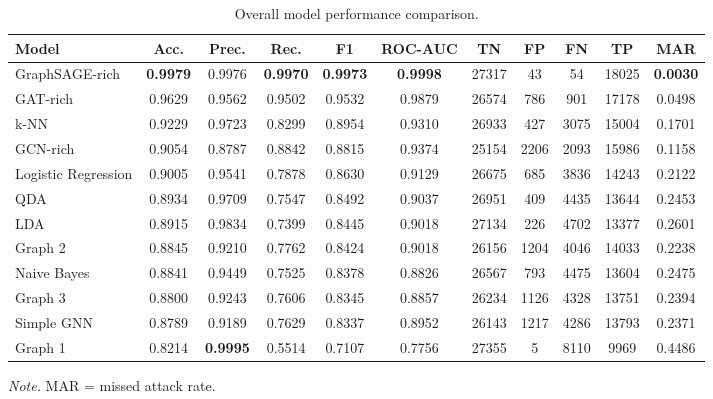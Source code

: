 \documentclass[final,5p,times,twocolumn]{elsarticle}
\begin{document}
\begin{table}[H]
\caption{Overall model performance comparison.}
\centering
\footnotesize
\setlength{\tabcolsep}{4.5pt}
\renewcommand{\arraystretch}{1.12}
\begin{tabular}{lcccccccccc}
\toprule
\textbf{Model} & \textbf{Acc.} & \textbf{Prec.} & \textbf{Rec.} & \textbf{F1} & \textbf{ROC-AUC} & \textbf{TN} & \textbf{FP} & \textbf{FN} & \textbf{TP} & \textbf{MAR} \\
\midrule
GraphSAGE-rich & \textbf{0.9979} & 0.9976 & \textbf{0.9970} & \textbf{0.9973} & \textbf{0.9998} & 27317 & 43 & 54 & 18025 & \textbf{0.0030} \\
GAT-rich & 0.9629 & 0.9562 & 0.9502 & 0.9532 & 0.9879 & 26574 & 786 & 901 & 17178 & 0.0498 \\
k-NN & 0.9229 & 0.9723 & 0.8299 & 0.8954 & 0.9310 & 26933 & 427 & 3075 & 15004 & 0.1701 \\
\color{red}GCN-rich & \color{red}0.9054 & \color{red}0.8787 & \color{red}0.8842 & \color{red}0.8815 & \color{red}0.9374 & \color{red}25154 & \color{red}2206 & \color{red}2093 & \color{red}15986 & \color{red}0.1158 \\
Logistic Regression & 0.9005 & 0.9541 & 0.7878 & 0.8630 & 0.9129 & 26675 & 685 & 3836 & 14243 & 0.2122 \\
QDA & 0.8934 & 0.9709 & 0.7547 & 0.8492 & 0.9037 & 26951 & 409 & 4435 & 13644 & 0.2453 \\
LDA & 0.8915 & 0.9834 & 0.7399 & 0.8445 & 0.9018 & 27134 & 226 & 4702 & 13377 & 0.2601 \\
\color{red}Graph 2 & \color{red}0.8845 & \color{red}0.9210 & \color{red}0.7762 & \color{red}0.8424 & \color{red}0.9018 & \color{red}26156 & \color{red}1204 & \color{red}4046 & \color{red}14033 & \color{red}0.2238 \\
Naive Bayes & 0.8841 & 0.9449 & 0.7525 & 0.8378 & 0.8826 & 26567 & 793 & 4475 & 13604 & 0.2475 \\
\color{red}Graph 3 & \color{red}0.8800 & \color{red}0.9243 & \color{red}0.7606 & \color{red}0.8345 & \color{red}0.8857 & \color{red}26234 & \color{red}1126 & \color{red}4328 & \color{red}13751 & \color{red}0.2394 \\
\color{red}Simple GNN & \color{red}0.8789 & \color{red}0.9189 & \color{red}0.7629 & \color{red}0.8337 & \color{red}0.8952 & \color{red}26143 & \color{red}1217 & \color{red}4286 & \color{red}13793 & \color{red}0.2371 \\
\color{red}Graph 1 & \color{red}0.8214 & \color{red}\textbf{0.9995} & \color{red}0.5514 & \color{red}0.7107 & \color{red}0.7756 & \color{red}27355 & \color{red}5 & \color{red}8110 & \color{red}9969 & \color{red}0.4486 \\
\bottomrule
\end{tabular}

\vspace{0.05cm}
\noindent\textit{Note.} MAR = missed attack rate.

\label{tab:overall_model_performance_updated}
\end{table}
\end{document}
